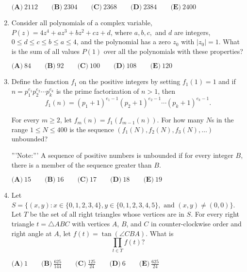 \documentclass{article}
\begin{document}
\begin{enumerate}[label=\arabic*., itemsep=0.5em]
$\textbf{(A)}\ 2112\qquad\textbf{(B)}\ 2304\qquad\textbf{(C)}\ 2368\qquad\textbf{(D)}\ 2384\qquad\textbf{(E)}\ 2400$\par \vspace{0.5em}\item Consider all polynomials of a complex variable, $P(z)=4z^4+az^3+bz^2+cz+d$, where $a,b,c,$ and $d$ are integers, $0\le d\le c\le b\le a\le 4$, and the polynomial has a zero $z_0$ with $|z_0|=1.$ What is the sum of all values $P(1)$ over all the polynomials with these properties?

$\textbf{(A)}\ 84\qquad\textbf{(B)}\ 92\qquad\textbf{(C)}\ 100\qquad\textbf{(D)}\ 108\qquad\textbf{(E)}\ 120 $\par \vspace{0.5em}\item Define the function $f_1$ on the positive integers by setting $f_1(1)=1$ and if $n=p_1^{e_1}p_2^{e_2}\cdots p_k^{e_k}$ is the prime factorization of $n>1$, then 
\begin{equation*}
f_1(n)=(p_1+1)^{e_1-1}(p_2+1)^{e_2-1}\cdots (p_k+1)^{e_k-1}.
\end{equation*}

For every $m\ge 2$, let $f_m(n)=f_1(f_{m-1}(n))$. For how many $N$s in the range $1\le N\le 400$ is the sequence $(f_1(N),f_2(N),f_3(N),\dots )$ unbounded?

'''Note:''' A sequence of positive numbers is unbounded if for every integer $B$, there is a member of the sequence greater than $B$.

$\textbf{(A)}\ 15\qquad\textbf{(B)}\ 16\qquad\textbf{(C)}\ 17\qquad\textbf{(D)}\ 18\qquad\textbf{(E)}\ 19 $\par \vspace{0.5em}\item Let $S=\{(x,y) : x\in \{0,1,2,3,4\}, y\in \{0,1,2,3,4,5\},\text{ and } (x,y)\ne (0,0)\}$. 
Let $T$ be the set of all right triangles whose vertices are in $S$. For every right triangle $t=\triangle{ABC}$ with vertices $A$, $B$, and $C$ in counter-clockwise order and right angle at $A$, let $f(t)=\tan(\angle{CBA})$. What is 
\begin{equation*}
\prod_{t\in T} f(t)?
\end{equation*}


$\textbf{(A)}\ 1\qquad\textbf{(B)}\ \frac{625}{144}\qquad\textbf{(C)}\ \frac{125}{24}\qquad\textbf{(D)}\ 6\qquad\textbf{(E)}\ \frac{625}{24} $\par \vspace{0.5em}\end{enumerate}
\end{document}
